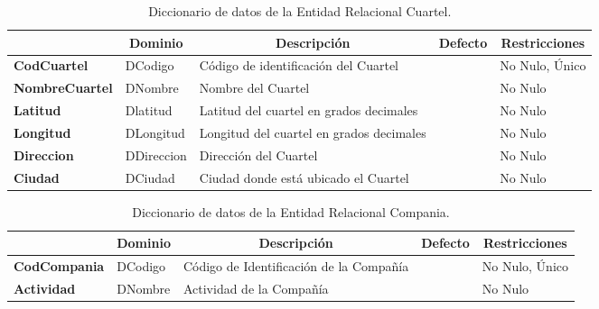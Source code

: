 \begin{table}[H]
\centering
\caption{Diccionario de datos de la Entidad Relacional Cuartel.}
\label{tab-DiccR-02}
\begin{tabular}{>{\bfseries}m{4.0cm}>{}m{3.0cm}>{}m{6.0cm}>{}m{5.0cm}>{}m{2.0cm}}
\toprule
\multicolumn{1}{c}{\textbf{Atributo}} & \multicolumn{1}{c}{\textbf{Dominio}} & \multicolumn{1}{c}{\textbf{Descripción}} & \multicolumn{1}{c}{\textbf{Defecto}} & \multicolumn{1}{c}{\textbf{Restricciones}} \\ \midrule
CodCuartel	    &   DCodigo	    &   Código de identificación del Cuartel	    &	&No Nulo, Único	\\
NombreCuartel	&   DNombre	    &   Nombre del Cuartel	                        &	&No Nulo	\\
Latitud	        &   Dlatitud	&   Latitud del cuartel en grados decimales	    &	&No Nulo	\\
Longitud	    &   DLongitud	&   Longitud del cuartel en grados decimales	&	&No Nulo	\\
Direccion	    &   DDireccion	&   Dirección del Cuartel	                    &	&No Nulo	\\
Ciudad	        &   DCiudad	    &   Ciudad donde está ubicado el Cuartel	    &	&No Nulo	\\\bottomrule
\end{tabular}
\end{table}

\begin{table}[H]
\centering
\caption{Diccionario de datos de la Entidad Relacional Compania.}
\label{tab-DiccR-03}
\begin{tabular}{>{\bfseries}m{4.0cm}>{}m{3.0cm}>{}m{6.0cm}>{}m{5.0cm}>{}m{2.0cm}}
\toprule
\multicolumn{1}{c}{\textbf{Atributo}} & \multicolumn{1}{c}{\textbf{Dominio}} & \multicolumn{1}{c}{\textbf{Descripción}} & \multicolumn{1}{c}{\textbf{Defecto}} & \multicolumn{1}{c}{\textbf{Restricciones}} \\ \midrule
CodCompania	    &   DCodigo	    &   Código de Identificación de la Compañía	        &	&No Nulo, Único	\\
Actividad	&   DNombre	    &   Actividad de la Compañía	                        &	&No Nulo	\\\bottomrule
\end{tabular}
\end{table}

